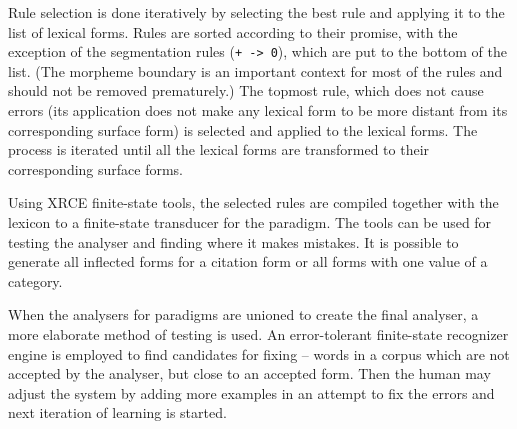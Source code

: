 Rule selection is done iteratively by selecting the best rule and applying it to the list of lexical forms. Rules are sorted according to their promise, with the exception of the segmentation rules (\texttt{+ -> 0}), which are put to the bottom of the list. (The morpheme boundary is an important context for most of the rules and should not be removed prematurely.) The topmost rule, which does not cause errors (its application does not make any lexical form to be more distant from its corresponding surface form) is selected and applied to the lexical forms. The process is iterated until all the lexical forms are transformed to their corresponding surface forms.  

Using XRCE finite-state tools, the selected rules are compiled together with the lexicon to a finite-state transducer for the paradigm. The tools can be used for testing the analyser and finding where it makes mistakes. It is possible to generate all inflected forms for a citation form or all forms with one value of a category. 

When the analysers for paradigms are unioned to create the final analyser, a more elaborate method of testing is used. An error-tolerant finite-state recognizer engine is employed to find candidates for fixing -- words in a corpus which are not accepted by the analyser, but close to an accepted form. Then the human may adjust the system by adding more examples in an attempt to fix the errors and next iteration of learning is started.

